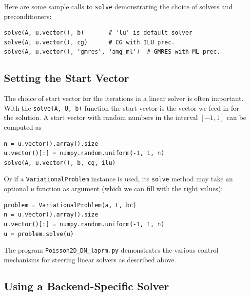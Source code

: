 Here are some sample calls to {\fontsize{12pt}{12pt}\texttt{solve}} demonstrating the choice
of solvers and preconditioners:
\begin{Verbatim}[fontsize=\fontsize{10pt}{10pt},tabsize=8,baselinestretch=1.05,
fontfamily=tt,xleftmargin=7mm]
solve(A, u.vector(), b)       # 'lu' is default solver
solve(A, u.vector(), cg)      # CG with ILU prec.
solve(A, u.vector(), 'gmres', 'amg_ml')  # GMRES with ML prec.
\end{Verbatim}
\noindent


\subsection{Setting the Start Vector}

The choice of start vector for the iterations in a linear solver is often
important. With the {\fontsize{12pt}{12pt}\texttt{solve(A, U, b)}} function the start vector
is the vector we feed in for the solution. A start vector
with random numbers in the interval $[-1,1]$ can be computed as
\begin{Verbatim}[fontsize=\fontsize{10pt}{10pt},tabsize=8,baselinestretch=1.05,
fontfamily=tt,xleftmargin=7mm]
n = u.vector().array().size
u.vector()[:] = numpy.random.uniform(-1, 1, n)
solve(A, u.vector(), b, cg, ilu)
\end{Verbatim}
\noindent
Or if a {\fontsize{12pt}{12pt}\texttt{VariationalProblem}} instance is used, its {\fontsize{12pt}{12pt}\texttt{solve}}
method may take an optional {\fontsize{12pt}{12pt}\texttt{u}} function as argument (which we
can fill with the right values):
\begin{Verbatim}[fontsize=\fontsize{10pt}{10pt},tabsize=8,baselinestretch=1.05,
fontfamily=tt,xleftmargin=7mm]
problem = VariationalProblem(a, L, bc)
n = u.vector().array().size
u.vector()[:] = numpy.random.uniform(-1, 1, n)
u = problem.solve(u)
\end{Verbatim}
\noindent

The program {\fontsize{12pt}{12pt}\verb!Poisson2D_DN_laprm.py!} demonstrates the various control mechanisms for
steering linear solvers as described above.

\subsection{Using a Backend-Specific Solver}


